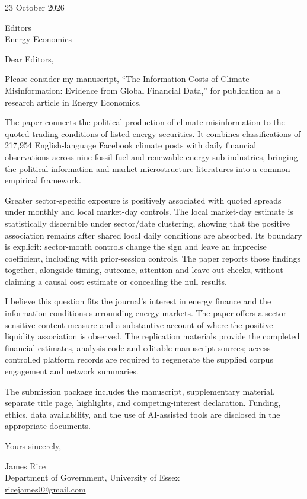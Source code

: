 \documentclass[12pt,a4paper]{article}
\begin{document}
23 October 2026

Editors\\Energy Economics

Dear Editors,

Please consider my manuscript, ``The Information Costs of Climate Misinformation: Evidence from Global Financial Data,'' for publication as a research article in Energy Economics.

The paper connects the political production of climate misinformation to the quoted trading conditions of listed energy securities. It combines classifications of 217,954 English-language Facebook climate posts with daily financial observations across nine fossil-fuel and renewable-energy sub-industries, bringing the political-information and market-microstructure literatures into a common empirical framework.

Greater sector-specific exposure is positively associated with quoted spreads under monthly and local market-day controls. The local market-day estimate is statistically discernible under sector/date clustering, showing that the positive association remains after shared local daily conditions are absorbed. Its boundary is explicit: sector-month controls change the sign and leave an imprecise coefficient, including with prior-session controls. The paper reports those findings together, alongside timing, outcome, attention and leave-out checks, without claiming a causal cost estimate or concealing the null results.

I believe this question fits the journal's interest in energy finance and the information conditions surrounding energy markets. The paper offers a sector-sensitive content measure and a substantive account of where the positive liquidity association is observed. The replication materials provide the completed financial estimates, analysis code and editable manuscript sources; access-controlled platform records are required to regenerate the supplied corpus engagement and network summaries.

The submission package includes the manuscript, supplementary material, separate title page, highlights, and competing-interest declaration. Funding, ethics, data availability, and the use of AI-assisted tools are disclosed in the appropriate documents.

Yours sincerely,

James Rice\\
Department of Government, University of Essex\\
\href{mailto:ricejames0@gmail.com}{ricejames0@gmail.com}
\end{document}
